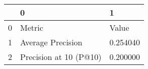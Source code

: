 \begin{tabular}{lll}
\toprule
 & 0 & 1 \\
\midrule
0 & Metric & Value \\
1 & Average Precision & 0.254040 \\
2 & Precision at 10 (P@10) & 0.200000 \\
\bottomrule
\end{tabular}
